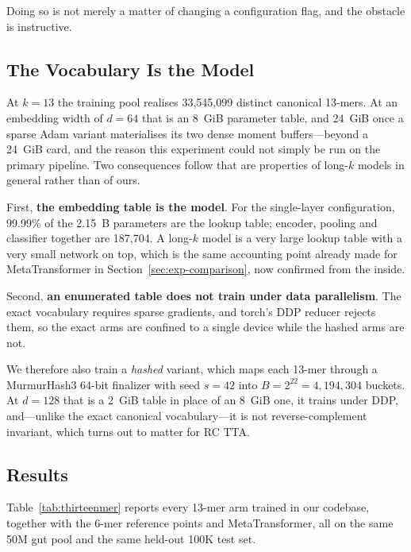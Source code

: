 Doing so is not merely a matter of changing a configuration flag, and the obstacle is instructive.

\subsection{The Vocabulary Is the Model}

At $k=13$ the training pool realises 33{,}545{,}099 distinct canonical 13-mers. At an embedding width of $d{=}64$ that is an 8~GiB parameter table, and 24~GiB once a sparse Adam variant materialises its two dense moment buffers---beyond a 24~GiB card, and the reason this experiment could not simply be run on the primary pipeline. Two consequences follow that are properties of long-$k$ models in general rather than of ours.

First, \textbf{the embedding table is the model}. For the single-layer configuration, 99.99\% of the 2.15~B parameters are the lookup table; encoder, pooling and classifier together are 187{,}704. A long-$k$ model is a very large lookup table with a very small network on top, which is the same accounting point already made for MetaTransformer in Section~\ref{sec:exp-comparison}, now confirmed from the inside.

Second, \textbf{an enumerated table does not train under data parallelism}. The exact vocabulary requires sparse gradients, and torch's DDP reducer rejects them, so the exact arms are confined to a single device while the hashed arms are not.

We therefore also train a \emph{hashed} variant, which maps each 13-mer through a MurmurHash3 64-bit finalizer with seed $s=42$ into $B=2^{22}=4{,}194{,}304$ buckets. At $d{=}128$ that is a 2~GiB table in place of an 8~GiB one, it trains under DDP, and---unlike the exact canonical vocabulary---it is not reverse-complement invariant, which turns out to matter for RC TTA.

\subsection{Results}

Table~\ref{tab:thirteenmer} reports every 13-mer arm trained in our codebase, together with the 6-mer reference points and MetaTransformer, all on the same 50M gut pool and the same held-out 100K test set.

